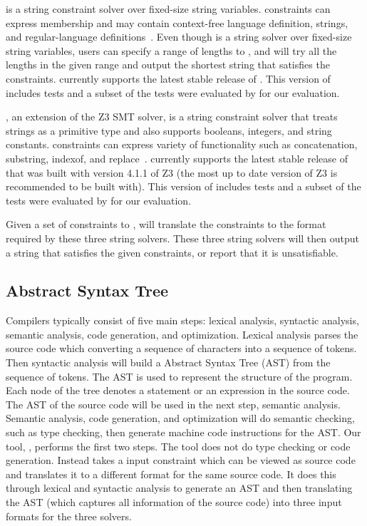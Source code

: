\hampi is a string constraint solver over fixed-size string variables. \hampi constraints can express
membership and may contain context-free language definition, strings, and regular-language
definitions~\cite{hampi2009}. Even though \hampi is a string solver over fixed-size string variables,
users can specify a range of lengths to \hampi, and \hampi will try all the lengths in the given range
and output the shortest string that satisfies the constraints.
\imss currently supports the latest stable release of \hampi. This version of \hampi
includes \hampitests tests and a subset of the \hampitests tests were evaluated by \imss for our evaluation.

\zstr, an extension of the Z3 SMT solver, is a string constraint solver that treats strings
as a primitive type and also supports booleans, integers, and string constants.
\zstr constraints can express variety of functionality such as concatenation, substring,
indexof, and replace~\cite{z32013}.
\imss currently supports the latest stable release of \zstr that was built with version
4.1.1 of Z3 (the most up to date version of Z3 \zstr is recommended to be built with).
This version of \zstr
includes \ztests tests and a subset of the \ztests tests were evaluated by \imss for our evaluation.

Given a set of constraints to \imss, \imss will translate the constraints to the format required by these three string solvers. These three string solvers will then output a string that satisfies the given constraints, or report that it is unsatisfiable.

\subsection{Abstract Syntax Tree}
Compilers typically consist of five main steps: lexical analysis, syntactic analysis, semantic
analysis, code generation, and optimization. Lexical analysis parses the source code which converting
a sequence of characters into a sequence of tokens. Then syntactic analysis will build a
Abstract Syntax Tree (AST) from the sequence of tokens. The AST is used to represent the structure
of the program. Each node of the tree denotes a statement or an expression in the source code.
The AST of the source code will be used in the next step, semantic analysis.
Semantic analysis, code generation, and optimization will do semantic checking, such as type checking,
then generate machine code instructions for the AST. Our tool, \imss, performs the first two steps.
The tool does not do type checking or code generation. Instead \imss takes a input constraint which can be
viewed as source code and translates it to a different format for the same source code.
It does this through lexical and syntactic analysis to generate an AST and then translating the AST (which captures all information of the source code) into three input formats
for the three solvers.
